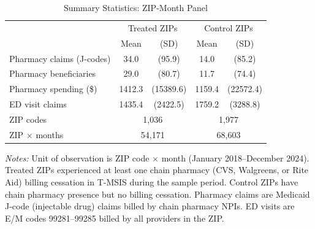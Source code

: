 \begin{table}[t]
\centering
\caption{Summary Statistics: ZIP-Month Panel}
\label{tab:sumstats}
\begin{threeparttable}
\begin{tabular}{lcccc}
\hline\hline
 & \multicolumn{2}{c}{Treated ZIPs} & \multicolumn{2}{c}{Control ZIPs} \\
 & Mean & (SD) & Mean & (SD) \\
\hline
Pharmacy claims (J-codes) & 34.0 & (95.9) & 14.0 & (85.2) \\
Pharmacy beneficiaries & 29.0 & (80.7) & 11.7 & (74.4) \\
Pharmacy spending (\$) & 1412.3 & (15389.6) & 1159.4 & (22572.4) \\
ED visit claims & 1435.4 & (2422.5) & 1759.2 & (3288.8) \\
\hline
ZIP codes & \multicolumn{2}{c}{1,036} & \multicolumn{2}{c}{1,977} \\
ZIP $\times$ months & \multicolumn{2}{c}{54,171} & \multicolumn{2}{c}{68,603} \\
\hline\hline
\end{tabular}
\begin{tablenotes}[flushleft]\footnotesize
\item \textit{Notes:} Unit of observation is ZIP code $\times$ month (January 2018--December 2024). Treated ZIPs experienced at least one chain pharmacy (CVS, Walgreens, or Rite Aid) billing cessation in T-MSIS during the sample period. Control ZIPs have chain pharmacy presence but no billing cessation. Pharmacy claims are Medicaid J-code (injectable drug) claims billed by chain pharmacy NPIs. ED visits are E/M codes 99281--99285 billed by all providers in the ZIP.
\end{tablenotes}\end{threeparttable}
\end{table}
